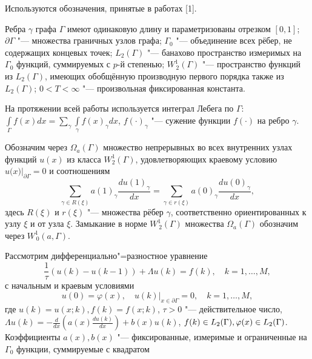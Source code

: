 \vzmscaption


Используются  обозначения, принятые в работах [1].

Ребра $ \gamma $ графа $ \Gamma $ имеют одинаковую длину и параметризованы отрезком $[0,1]$; $ \partial \Gamma  $ "--- множества граничных  узлов графа; $ {{\Gamma }_{0}} $ "--- объединение всех рёбер, не содержащих концевых точек; $L_{2}(\Gamma)$ "--- банахово пространство измеримых на $\Gamma_0$ функций, суммируемых с $p$-й степенью; $W_{\,2}^{1}(\Gamma)$ "--- пространство функций из $L_{2}(\Gamma)$, имеющих обобщённую производную первого порядка также из $L_{2}(\Gamma)$; $ 0<T<\infty $ "--- произвольная фиксированная константа.

На протяжении всей работы используется интеграл Лебега по $\Gamma$: $\int\limits_{\Gamma}f(x)dx=\sum\limits_{\gamma}\int\limits_{\gamma}f(x)_\gamma dx$, $f(\cdot)_\gamma$ "--- сужение функции $f(\cdot)$ на ребро $\gamma$.

Обозначим через  $ {{\Omega }_{a}}(\Gamma ) $ множество непрерывных во всех внутренних узлах функций $ u(x) $ из класса $ W_{2}^{1}(\Gamma ) $, удовлетворяющих краевому условию $ u(x{{)|}_{\partial \Gamma }}=0 $ и соотношениям  
\begin{equation*}{
\sum\limits_{\gamma \in R(\xi )}{}a{{(1)}_{\gamma }}\frac{du{{(1)}_{\gamma }}}{dx}=\sum\limits_{\gamma \in r(\xi )}{}a{{(0)}_{\gamma }}\frac{du{{(0)}_{\gamma }}}{dx},}
\end{equation*}
здесь $R(\xi)$ и $r(\xi)$ "--- множества рёбер $\gamma$, соответственно ориентированных к узлу $\xi$ и от узла $\xi$. Замыкание в норме $W^1_{\,2}(\Gamma)$ множества $\Omega_a(\Gamma)$  обозначим через  $W^1_{\,0}(a,\Gamma)$.

Рассмотрим дифференциально"=разностное уравнение
\begin{equation}{
		\frac{1}{\tau}(u(k)-u(k-1))+\Lambda u(k)=f(k),\quad k=1,\ldots,M,
	}
\end{equation}
с начальным и краевым условиями
\begin{equation}{
		u(0)=\varphi (x),\quad u(k){{|}_{x\in \partial \Gamma }}=0,\quad k=1,\ldots,M, 	
	}
\end{equation}
где $ u(k)=u(x;k), f(k)=f(x;k) $, $ \tau>0 $ "--- действительное число, $ \Lambda u(k)=-\frac{d}{dx}\left( a(x)\frac{du(k)}{dx} \right)+b(x)u(k) $, $f(k)\in L_2(\Gamma),\quad \\\varphi (x)\in L_2(\Gamma)$. Коэффициенты  $ a(x),b(x) $ "--- фиксированные, измеримые и ограниченные на $ {{\Gamma }_{0}}  $ функции, суммируемые с квадратом
 
